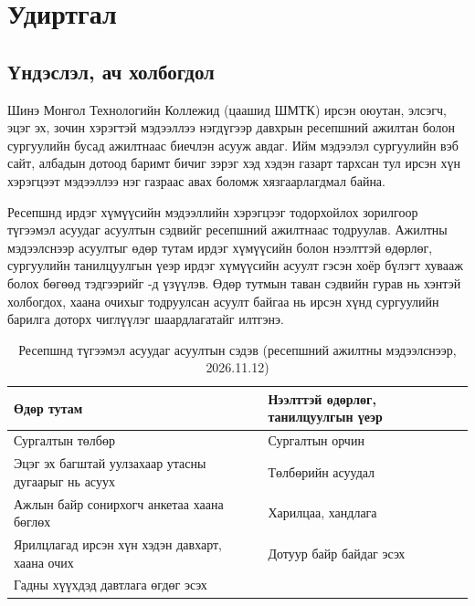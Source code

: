 \chapter{Удиртгал}
\label{ch:introduction}


\section{Үндэслэл, ач холбогдол}
\label{sec:intro-background}

Шинэ Монгол Технологийн Коллежид (цаашид ШМТК) ирсэн оюутан, элсэгч, эцэг эх, зочин хэрэгтэй мэдээллээ нэгдүгээр давхрын ресепшний ажилтан болон сургуулийн бусад ажилтнаас биечлэн асууж авдаг. Ийм мэдээлэл сургуулийн вэб сайт, албадын дотоод баримт бичиг зэрэг хэд хэдэн газарт тархсан тул ирсэн хүн хэрэгцээт мэдээллээ нэг газраас авах боломж хязгаарлагдмал байна.

Ресепшнд ирдэг хүмүүсийн мэдээллийн хэрэгцээг тодорхойлох зорилгоор түгээмэл асуудаг асуултын сэдвийг ресепшний ажилтнаас тодруулав. Ажилтны мэдээлснээр асуултыг өдөр тутам ирдэг хүмүүсийн болон нээлттэй өдөрлөг, сургуулийн танилцуулгын үеэр ирдэг хүмүүсийн асуулт гэсэн хоёр бүлэгт хувааж болох бөгөөд тэдгээрийг -д үзүүлэв. Өдөр тутмын таван сэдвийн гурав нь хэнтэй холбогдох, хаана очихыг тодруулсан асуулт байгаа нь ирсэн хүнд сургуулийн барилга доторх чиглүүлэг шаардлагатайг илтгэнэ.

\begin{table}[ht]
\centering
\caption{Ресепшнд түгээмэл асуудаг асуултын сэдэв (ресепшний ажилтны мэдээлснээр, 2026.11.12)}
\label{tab:reception_topics}
\begin{tabular}{|p{6.8cm}|p{6.8cm}|}
\hline
\textbf{Өдөр тутам} & \textbf{Нээлттэй өдөрлөг, танилцуулгын үеэр} \\
\hline
Сургалтын төлбөр & Сургалтын орчин \\
\hline
Эцэг эх багштай уулзахаар утасны дугаарыг нь асуух & Төлбөрийн асуудал \\
\hline
Ажлын байр сонирхогч анкетаа хаана бөглөх & Харилцаа, хандлага \\
\hline
Ярилцлагад ирсэн хүн хэдэн давхарт, хаана очих & Дотуур байр байдаг эсэх \\
\hline
Гадны хүүхдэд давтлага өгдөг эсэх & \\
\hline
\end{tabular}
\end{table}

